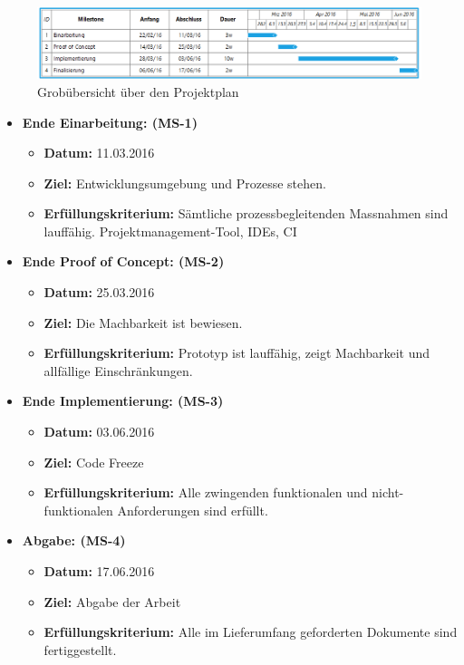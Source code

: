 \begin{figure}[ht]
	\centering
	\includegraphics[width=\textwidth]{images/projplan.png}
	\caption{Grobübersicht über den Projektplan}
	\label{Risk result}
\end{figure}

\begin{itemize}
	\item{\textbf{Ende Einarbeitung: (MS-1)} 
		\begin{itemize}
			\item{\textbf{Datum:} 11.03.2016}
			\item{\textbf{Ziel:} Entwicklungsumgebung und Prozesse stehen.}
			\item{\textbf{Erfüllungskriterium:} Sämtliche prozessbegleitenden Massnahmen sind lauffähig. Projektmanagement-Tool, IDEs, CI}
		\end{itemize}
	}
	
	\item{\textbf{Ende Proof of Concept: (MS-2)} 
		\begin{itemize}
			\item{\textbf{Datum:} 25.03.2016}
			\item{\textbf{Ziel:} Die Machbarkeit ist bewiesen.}
			\item{\textbf{Erfüllungskriterium:} Prototyp ist lauffähig, zeigt Machbarkeit und allfällige Einschränkungen.}
		\end{itemize}
	}
	
	\item{\textbf{Ende Implementierung: (MS-3)} 
		\begin{itemize}
			\item{\textbf{Datum:} 03.06.2016}
			\item{\textbf{Ziel:} Code Freeze}
			\item{\textbf{Erfüllungskriterium:} Alle zwingenden funktionalen und nicht-funktionalen Anforderungen sind erfüllt.}
		\end{itemize}
	}	
	\item{\textbf{Abgabe: (MS-4)} 
			\begin{itemize}
				\item{\textbf{Datum:} 17.06.2016}
				\item{\textbf{Ziel:} Abgabe der Arbeit}
				\item{\textbf{Erfüllungskriterium:} Alle im Lieferumfang geforderten Dokumente sind fertiggestellt.}
			\end{itemize}
	}
	
\end{itemize}

